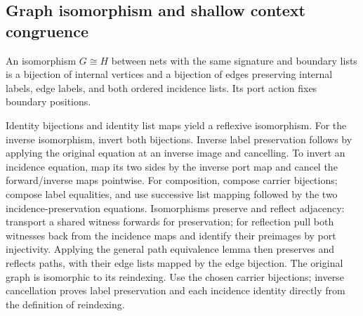 \subsection{Graph isomorphism and shallow context congruence}
\begin{definition}[Isomorphism]\label{term:isomorphism}
An isomorphism $G\cong H$ between nets with the same signature and boundary lists
is a bijection of internal vertices and a bijection of edges preserving internal
labels, edge labels, and both ordered incidence lists. Its port action fixes
boundary positions.
\end{definition}
Identity bijections and identity list maps yield a reflexive isomorphism. For the
inverse isomorphism, invert both bijections. Inverse label preservation follows
by applying the original equation at an inverse image and cancelling. To invert
an incidence equation, map its two sides by the inverse port map and cancel the
forward/inverse maps pointwise. For composition, compose carrier bijections;
compose label equalities, and use successive list mapping followed by the two
incidence-preservation equations.
Isomorphisms preserve and reflect adjacency: transport a shared witness forwards
for preservation; for reflection pull both witnesses back from the incidence
maps and identify their preimages by port injectivity. Applying the general path
equivalence lemma then preserves and reflects paths, with their edge lists
mapped by the edge bijection.
The original graph is isomorphic to its reindexing. Use the chosen carrier
bijections; inverse cancellation proves label preservation and each incidence
identity directly from the definition of reindexing.

